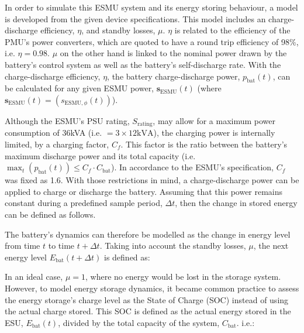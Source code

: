 In order to simulate this ESMU system and its energy storing behaviour, a model is developed from the given device specifications.
This model includes an charge-discharge efficiency, $\eta$, and standby losses, $\mu$.
$\eta$ is related to the efficiency of the PMU's power converters, which are quoted to have a round trip efficiency of 98\%, i.e. $\eta = 0.98$.
$\mu$ on the other hand is linked to the nominal power drawn by the battery's control system as well as the battery's self-discharge rate.
With the charge-discharge efficiency, $\eta$, the battery charge-discharge power, $p_\text{bat}(t)$, can be calculated for any given ESMU power, $\textbf{s}_\text{ESMU}(t)$ (where $\textbf{s}_\text{ESMU}(t) = (s_{\text{ESMU},\phi}(t))$).




Although the ESMU's PSU rating, $S_\text{rating}$, may allow for a maximum power consumption of 36kVA (i.e. $=3\times12\text{kVA}$), the charging power is internally limited, by a charging factor, $C_f$.
This factor is the ratio between the battery's maximum discharge power and its total capacity (i.e. $\max_t (p_\text{bat}(t)) \leq C_f \cdot C_\text{bat}$).
In accordance to the ESMU's specification, $C_f$ was fixed as 1.6.
With those restrictions in mind, a charge-discharge power can be applied to charge or discharge the battery.
Assuming that this power remains constant during a predefined sample period, $\Delta t$, then the change in stored energy can be defined as follows.



\nomenclature[I]{$\mu$}{Self-discharge losses of battery, where $\mu \in (0, 1]$}

The battery's dynamics can therefore be modelled as the change in energy level from time $t$ to time $t+\Delta t$.
Taking into account the standby losses, $\mu$, the next energy level $E_\text{bat}(t+\Delta t)$ is defined as:



In an ideal case, $\mu = 1$, where no energy would be lost in the storage system.
However, to model energy storage dynamics, it became common practice to assess the energy storage's charge level as the State of Charge (SOC) instead of using the actual charge stored.
This SOC is defined as the actual energy stored in the ESU, $E_\text{bat}(t)$, divided by the total capacity of the system, $C_\text{bat}$. i.e.:


